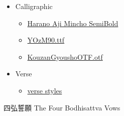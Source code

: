 \documentclass[letterpaper]{article}
\begin{document}
\vspace*{1cm}

\begin{itemize}
	\item[] {\LARGE Calligraphic}
	\begin{itemize}
		\item[] \href{https://gwmatthews.github.io/the-four-vows-HaranoAjiMinchoSB.pdf}{Harano Aji Mincho SemiBold}
		\item[] \href{https://gwmatthews.github.io/the-four-vows-YOzM90.pdf}{YOzM90.ttf}
		\item[] \href{https://gwmatthews.github.io/the-four-vows-KouzanGyousho.pdf}{KouzanGyoushoOTF.otf}
	\end{itemize}
\end{itemize}
\vspace*{1cm}

\begin{itemize}
\item[] {\LARGE Verse}
\begin{itemize}
	\item[] \href{https://gwmatthews.github.io/verse-test.pdf}{verse styles}
	
\end{itemize}

\end{itemize}
	
	
	
	
	\vfill\eject\pagebreak
	
\centering 四弘誓願 The Four Bodhisattva Vows
\end{document}
